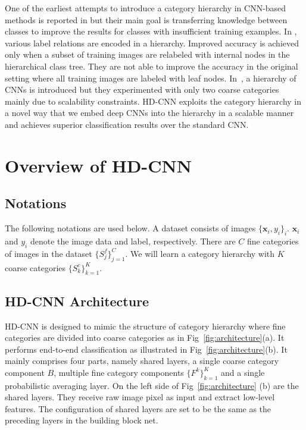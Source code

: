 \documentclass[10pt,twocolumn,letterpaper]{article}
\begin{document}
One of the earliest attempts to introduce a category hierarchy in CNN-based methods is reported in \cite{srivastava2013discriminative} but their main goal is transferring knowledge between classes to improve the results for classes with insufficient training examples. In \cite{deng2014large}, various label relations are encoded in a hierarchy. Improved accuracy is achieved only when a subset of training images are relabeled with internal nodes in the hierarchical class tree. They are not able to improve the accuracy in the original setting where all training images are labeled with leaf nodes. In~\cite{xiao2014error}, a hierarchy of CNNs is introduced but they experimented with only two coarse categories mainly due to scalability constraints. HD-CNN exploits the category hierarchy in a novel way that we embed deep CNNs into the hierarchy in a scalable manner and achieves superior classification results over the standard CNN.















\section{Overview of HD-CNN}
\label{sec:overview}

\subsection{Notations}
The following notations are used below. A dataset consists of images $\{\mathbf{x}_i,y_i\}_{i}$. $\mathbf{x}_i$ and $y_i$ denote the image data and label, respectively. There are $C$ fine categories of images in the dataset $ \{S^f_j\}_{j=1}^C$. We will learn a category hierarchy with $K$ coarse categories $ \{S^c_{k}\}_{k=1}^{K} $.

\subsection{HD-CNN Architecture}

HD-CNN is designed to mimic the structure of category hierarchy where fine categories are divided into coarse categories as in Fig~\ref{fig:architecture}(a). It performs end-to-end classification as illustrated in Fig~\ref{fig:architecture}(b). It mainly comprises four parts, namely shared layers, a single coarse category component $B$, multiple fine category components $\{F^{k}\}_{k=1}^{K} $ and a single probabilistic averaging layer. On the left side of Fig~\ref{fig:architecture} (b) are the shared layers. They receive raw image pixel as input and extract low-level features. The configuration of shared layers are set to be the same as the preceding layers in the building block net.
\end{document}
